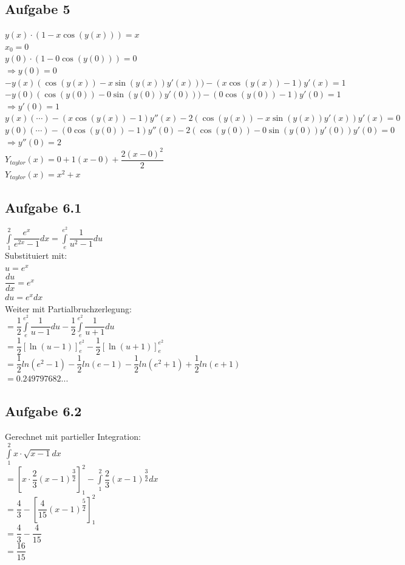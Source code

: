 \documentclass[11pt,final]{scrreprt}
\newcommand{\br} {\medskip\\}
\begin{document}
\subsection*{Aufgabe 5}
$ y(x)\cdot(1-x\cos(y(x))) = x $\\
$x_0 = 0$\\
$y(0)\cdot(1-0\cos(y(0))) = 0$\\
$\Rightarrow y(0) = 0$\br
$ -y(x)(\cos(y(x))-x\sin(y(x))y'(x)))-(x\cos(y(x))-1)y'(x) = 1 $\\
$ -y(0)(\cos(y(0))-0\sin(y(0))y'(0)))-(0\cos(y(0))-1)y'(0) = 1 $\\
$\Rightarrow y'(0) = 1$\br
$ y(x)(\cdots) - (x\cos(y(x))-1)y''(x)-2\left(\cos(y(x))-x\sin(y(x))y'(x)\right)y'(x)=0 $\\
$ y(0)(\cdots) - (0\cos(y(0))-1)y''(0)-2\left(\cos(y(0))-0\sin(y(0))y'(0)\right)y'(0)=0 $\\
$\Rightarrow y''(0) = 2$\br
$ Y_{taylor}(x) = 0+1(x-0)+\dfrac{2(x-0)^2}{2} $\\
$ Y_{taylor}(x) = x^2+x$
\subsection*{Aufgabe 6.1}
$ \int\limits_1^2\dfrac{e^x}{e^{2x}-1} dx = \int\limits_e^{e^2}\dfrac{1}{u^2-1}du $\\
Substituiert mit:\\
$u=e^x$\\
$\dfrac{du}{dx} = e^x$\\
$du = e^x dx$\\
Weiter mit Partialbruchzerlegung:\\
$ = \dfrac{1}{2}\int\limits_e^{e^2}\dfrac{1}{u-1}du-\dfrac{1}{2}\int\limits_e^{e^2}\dfrac{1}{u+1}du$\\
$ = \dfrac{1}{2}[\ln(u-1)]_e^{e^2}-\dfrac{1}{2}[\ln(u+1)]_e^{e^2}$\\
$ = \dfrac{1}{2}ln(e^2-1)-\dfrac{1}{2}ln(e-1)-\dfrac{1}{2}ln(e^2+1)+\dfrac{1}{2}ln(e+1)$\\
$ = 0.249797682...$
\subsection*{Aufgabe 6.2}
Gerechnet mit partieller Integration:\\
$ \int\limits_1^2x\cdot\sqrt{x-1}dx $\\
$= [x\cdot\dfrac{2}{3}(x-1)^{\dfrac{3}{2}}]_1^2-\int\limits_1^2\dfrac{2}{3}(x-1)^{\dfrac{3}{2}} dx $\\
$= \dfrac{4}{3}-[\dfrac{4}{15}(x-1)^{\dfrac{5}{2}}]_1^2$\\
$= \dfrac{4}{3} - \dfrac{4}{15}$\\
$=\dfrac{16}{15}$
\end{document}
